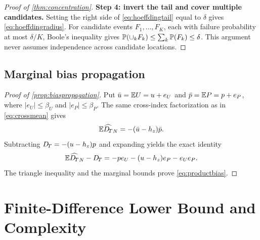 \begin{proof}[Proof of \cref{thm:concentration}]
\textbf{Step 4: invert the tail and cover multiple candidates.}
Setting the right side of \cref{eq:hoeffdingtail} equal to $\delta$ gives
\cref{eq:hoeffdingradius}.  For candidate events $F_1,\ldots,F_K$, each with
failure probability at most $\delta/K$, Boole's inequality gives
$\mathbb{P}(\cup_kF_k)\le\sum_k\mathbb{P}(F_k)\le\delta$.  This argument never assumes
independence across candidate locations.
\end{proof}

\subsection{Marginal bias propagation}

\begin{proof}[Proof of \cref{prop:biaspropagation}]
Put $\bar u=\mathbb{E} U=u+e_U$ and $\bar p=\mathbb{E} P=p+e_P$, where
$|e_U|\le\beta_U$ and $|e_P|\le\beta_P$.  The same cross-index factorization
as in \cref{eq:crossmean} gives
\begin{equation}
 \mathbb{E}\widehat{D_{\!T}}_N=-(\bar u-h_z)\bar p.
\end{equation}
Subtracting $D_{\!T}=-(u-h_z)p$ and expanding yields the exact identity
\begin{equation}
 \mathbb{E}\widehat{D_{\!T}}_N-D_{\!T}
 =-p e_U-(u-h_z)e_P-e_Ue_P.
\end{equation}
The triangle inequality and the marginal bounds prove
\cref{eq:productbias}.
\end{proof}

\section{Finite-Difference Lower Bound and Complexity}
\label{app:rareevent}

